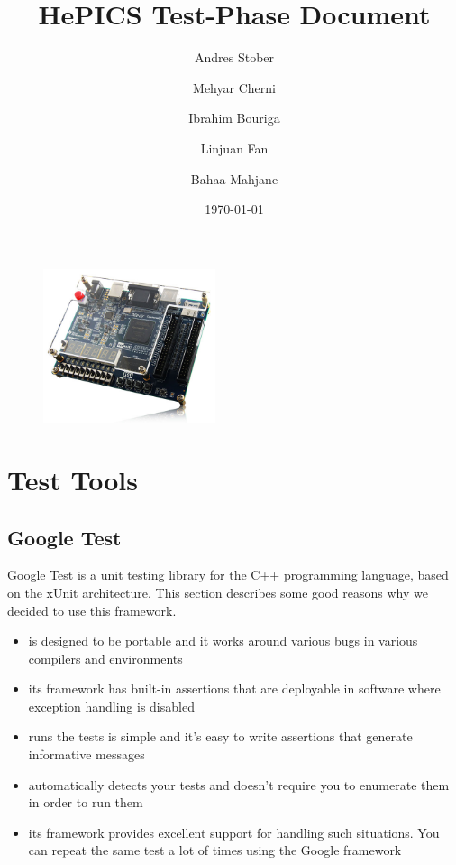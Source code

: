 \documentclass[parskip=full]{scrartcl}
\title{\Huge \textbf{HePICS Test-Phase Document}}
\date{\today \vspace{+10ex}}
\author{Andres Stober \\
	\and Mehyar Cherni \\
	\and Ibrahim Bouriga \\ 
	\and Linjuan Fan \\
	\and Bahaa Mahjane \\ }
\newcommand\tab[1][1cm]{\hspace*{#1}}
\begin{document}
\maketitle
\thispagestyle{empty}


\begin{figure}[b]
\centering
\includegraphics[width=0.45\textwidth, center]{boardimage.jpg}
\end{figure}

\pagebreak

\tableofcontents
\thispagestyle{empty}
\pagebreak

\section{Test Tools}

    \subsection{Google Test}
    \tab Google Test is a unit testing library for the C++ programming language, based on the xUnit architecture. This section describes some good reasons why we decided to use this framework.
    
    \begin{itemize}
        \item is designed to be portable and it works around various bugs in various compilers and environments
        \item its framework has built-in assertions that are deployable in software where exception handling is disabled
        \item runs the tests is simple and it’s easy to write assertions that generate informative messages
        \item automatically detects your tests and doesn’t require you to enumerate them in order to run them
        \item its framework provides excellent support for handling such situations. You can repeat the same test a lot of times using the Google framework
    \end{itemize}
    
\end{document}
